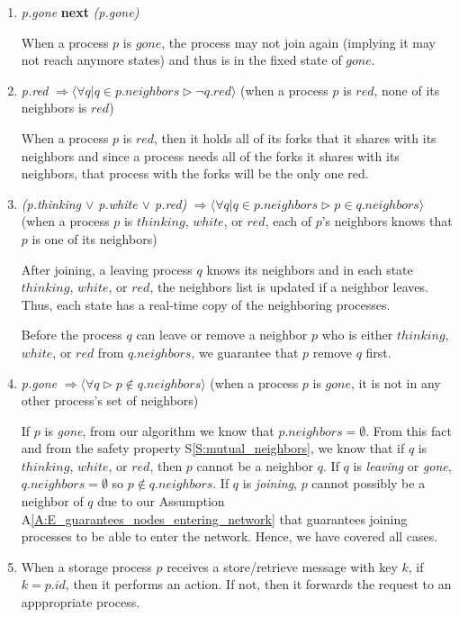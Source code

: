 \documentclass[11pt]{article}
\begin{document}
\begin{enumerate}[S1]
\item {\it p.gone} {\bfseries next} {\it (p.gone)}

When a process $p$ is $gone$, the process may not join again (implying it may not reach anymore states) and thus is in the fixed state of $gone$.

\item {\it p.red} $\Rightarrow \langle \forall q | q \in p.neighbors \rhd \neg q.red \rangle$
(when a process $p$ is $red$, none of its neighbors is $red$)

When a process $p$ is $red$, then it holds all of its forks that it shares with its neighbors and since a process needs all of the forks it shares with its neighbors, that process with the forks will be the only one red.


\item \label{S:mutual_neighbors} {\it (p.thinking $\vee$ p.white $\vee$ p.red)} $\Rightarrow \langle \forall q | q \in p.neighbors \rhd p \in q.neighbors \rangle$
(when a process $p$ is $thinking$, $white$, or $red$, each of $p$'s neighbors knows that $p$ is one of its neighbors)

After joining, a leaving process $q$ knows its neighbors and in each state $thinking$, $white$, or $red$, the neighbors list is updated if a neighbor leaves. Thus, each state has a real-time copy of the neighboring processes.

Before the process $q$ can leave or remove a neighbor $p$ who is either $thinking$, $white$, or $red$ from $q.neighbors$, we guarantee that $p$ remove $q$ first.

\item {\it p.gone} $\Rightarrow \langle \forall q  \rhd p\not\in q.neighbors \rangle$
(when a process $p$ is $gone$, it is not in any other process's set of neighbors)

If $p$ is \emph{gone}, from our algorithm we know that $p.neighbors = \emptyset$. From this fact and from the safety property S\ref{S:mutual_neighbors}, we know that if $q$ is $thinking$, $white$, or $red$, then $p$ cannot be a neighbor $q$. If $q$ is \emph{leaving} or \emph{gone}, $q.neighbors = \emptyset$ so $p\not\in q.neighbors.$ If $q$ is \emph{joining}, $p$ cannot possibly be a neighbor of $q$ due to our Assumption A\ref{A:E_guarantees_nodes_entering_network} that guarantees joining processes to be able to enter the network. Hence, we have covered all cases.



\item When a storage process $p$ receives a store/retrieve message with key $k$, if $k = p.id$, then it performs an action. If not, then it forwards the request to an apppropriate process.


\end{enumerate}
\end{document}
